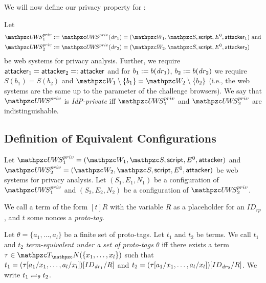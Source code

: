 \begin{theorem}
  We will now define our privacy property for \uppresso:
  
  \begin{definition}\label{def:idp-privacy}
    Let 
    \begin{align*}
      \uppressoprivwebsystem_1 := \uppressoprivwebsystem(\mi{dr}_1) =
      (\bidsystem_1, \scriptset, \mathsf{script}, E^0, \fAP{attacker}_1)&\text{ and}\\
      \uppressoprivwebsystem_2 := \uppressoprivwebsystem(\mi{dr}_2) =
      (\bidsystem_2, \scriptset, \mathsf{script}, E^0, \fAP{attacker}_2)&
    \end{align*}
    be \uppresso web systems for privacy analysis.  Further, we require
    $\mathsf{attacker}_1 = \mathsf{attacker}_2 =: \mathsf{attacker}$ and for $b_1
    := b(\mathit{dr}_1)$, $b_2 := b(\mathit{dr}_2)$ we require $S(b_1) = S(b_2)$
    and $\bidsystem_1 \setminus \{b_1\} = \bidsystem_2 \setminus
    \{b_2\}$ (i.e., the web systems are the same up to the parameter of
    the challenge browsers).  We say that $\uppressoprivwebsystem$ is
    \emph{IdP-private} iff $\uppressoprivwebsystem_1$ and
    $\uppressoprivwebsystem_2$ are indistinguishable.
  \end{definition}
  
  \subsection{Definition of Equivalent Configurations}\label{app:defin-equiv-stat}
  
  Let $\uppressoprivwebsystem_1 = (\bidsystem_1, \scriptset, \mathsf{script}, E^0, \fAP{attacker})$ 
  and $\uppressoprivwebsystem_2 = (\bidsystem_2, \scriptset, \mathsf{script}, E^0, \fAP{attacker})$ 
  be \uppresso web systems for privacy analysis. Let $(S_1,E_1,N_1)$ 
  be a configuration of $\uppressoprivwebsystem_1$ and $(S_2,E_2,N_2)$ 
  be a configuration of $\uppressoprivwebsystem_2$.
  
  \begin{definition}
    We call a term of the form $[t]R$ with the variable
    $R$ as a placeholder for an $ID_{rp}$, and $t$ some nonces a
    \emph{proto-tag}.
  \end{definition}
  
  \begin{definition}
    Let $\theta = \{a_1, \ldots, a_l \}$ be a finite set of proto-tags.
    Let $t_1$ and $t_2$ be terms. We call $t_1$ and $t_2$
    \emph{term-equivalent under a set of proto-tags $\theta$} iff there
    exists a term $\tau \in \terms(\{x_1,\dots,x_l\})$ such that
    $t_1 = (\tau [ a_1 / x_1 , \dots , a_l / x_l ])[ ID_{\mathit{dr}_1} / R ]$ and
    $t_2 = (\tau [ a_1 / x_1 , \dots , a_l / x_l ])[ ID_{\mathit{dr}_2} / R ]$.
    We write $t_1 \rightleftharpoons_{\theta} t_2$.
  

\end{definition}
\end{theorem}
